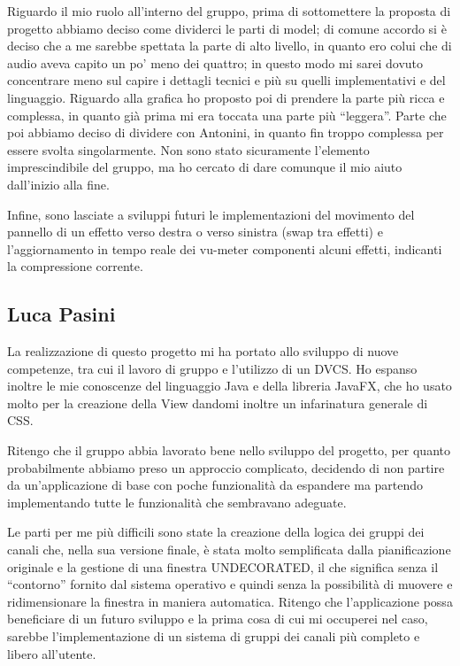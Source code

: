 \documentclass[a4paper,12pt]{report}
\begin{document}
Riguardo il mio ruolo all’interno del gruppo, prima di sottomettere la proposta di progetto abbiamo deciso come dividerci le parti di model; di comune accordo si è deciso che a me sarebbe spettata la parte di alto livello, in quanto ero colui che di audio aveva capito un po' meno dei quattro; in questo modo mi sarei dovuto concentrare meno sul capire i dettagli tecnici e più su quelli implementativi e del linguaggio. Riguardo alla grafica ho proposto poi di prendere la parte più ricca e complessa, in quanto già prima mi era toccata una parte più “leggera”. Parte che poi abbiamo deciso di dividere con Antonini, in quanto fin troppo complessa per essere svolta singolarmente. Non sono stato sicuramente l’elemento imprescindibile del gruppo, ma ho cercato di dare comunque il mio aiuto dall’inizio alla fine.

Infine, sono lasciate a sviluppi futuri le implementazioni del movimento del pannello di un effetto verso destra o verso sinistra (swap tra effetti) e l’aggiornamento in tempo reale dei vu-meter componenti alcuni effetti, indicanti la compressione corrente.

\subsection{Luca Pasini}
La realizzazione di questo progetto mi ha portato allo sviluppo di nuove competenze, tra cui il lavoro di gruppo e l’utilizzo di un DVCS.  Ho espanso inoltre le mie conoscenze del linguaggio Java e della libreria JavaFX, che ho usato molto per la creazione della View dandomi inoltre un infarinatura generale di CSS. 

Ritengo che il gruppo abbia lavorato bene nello sviluppo del progetto, per quanto probabilmente abbiamo preso un approccio complicato, decidendo di non partire da un'applicazione di base con poche funzionalità da espandere ma partendo implementando tutte le funzionalità che sembravano adeguate.

Le parti per me più difficili sono state la creazione della logica dei gruppi dei canali che, nella sua versione finale, è stata molto semplificata dalla pianificazione originale e la gestione di una finestra UNDECORATED, il che significa senza il “contorno” fornito dal sistema operativo e quindi senza la possibilità di muovere e ridimensionare la finestra in maniera automatica.
Ritengo che l’applicazione possa beneficiare di un futuro sviluppo e la prima cosa di cui mi occuperei nel caso, sarebbe l’implementazione di un sistema di gruppi dei canali più completo e libero all’utente.
\end{document}
